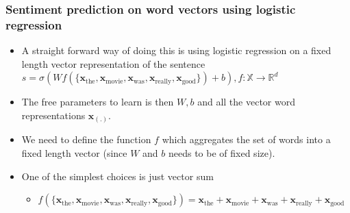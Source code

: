 \documentclass{beamer}
\renewcommand{\vec}[1]{{\boldsymbol{#1}}}
\newcommand{\svec}[2]{{\vec{#1}_{#2}}}
\begin{document}
  \begin{frame}
    \frametitle{Sentiment prediction on word vectors using logistic regression}
    \begin{itemize}
          \item A straight forward way of doing this is using logistic regression on a fixed length vector representation of the sentence
      $s = \sigma(W f(\{ \svec{x}{\text{the}}, \svec{x}{\text{movie}}, \svec{x}{\text{was}}, \svec{x}{\text{really}}, \svec{x}{\text{good}} \}) + b), f: \mathbb{X} \rightarrow \mathbb{R}^d$

          \item The free parameters to learn is then $W, b$ and all the vector word representations $\svec{x}{(.)}$.
          \item We need to define the function $f$ which aggregates the set of words into a fixed length vector (since $W$ and $b$ needs to be of fixed size).
          \item One of the simplest choices is just vector sum
            \begin{itemize}
            \item $f(\{ \svec{x}{\text{the}}, \svec{x}{\text{movie}}, \svec{x}{\text{was}}, \svec{x}{\text{really}}, \svec{x}{\text{good}} \}) = \svec{x}{\text{the}}+\svec{x}{\text{movie}}+\svec{x}{\text{was}}+\svec{x}{\text{really}}+\svec{x}{\text{good}}$
            \end{itemize}
    \end{itemize}
    \end{frame}
\end{document}
